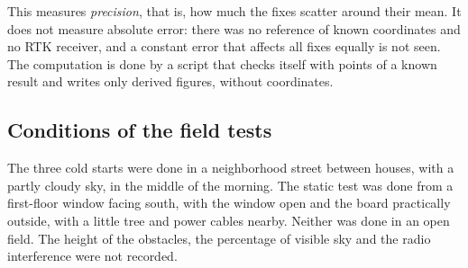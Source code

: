 This measures \emph{precision}, that is, how much the fixes scatter around their mean. It does not measure
absolute error: there was no reference of known coordinates and no RTK receiver, and a constant error that
affects all fixes equally is not seen. The computation is done by a script that checks itself with points of a
known result and writes only derived figures, without coordinates.

\subsection{Conditions of the field tests}

The three cold starts were done in a neighborhood street between houses, with a partly cloudy sky, in the
middle of the morning. The static test was done from a first-floor window facing south, with the window open
and the board practically outside, with a little tree and power cables nearby. Neither was done in an open
field. The height of the obstacles, the percentage of visible sky and the radio interference were not
recorded.
